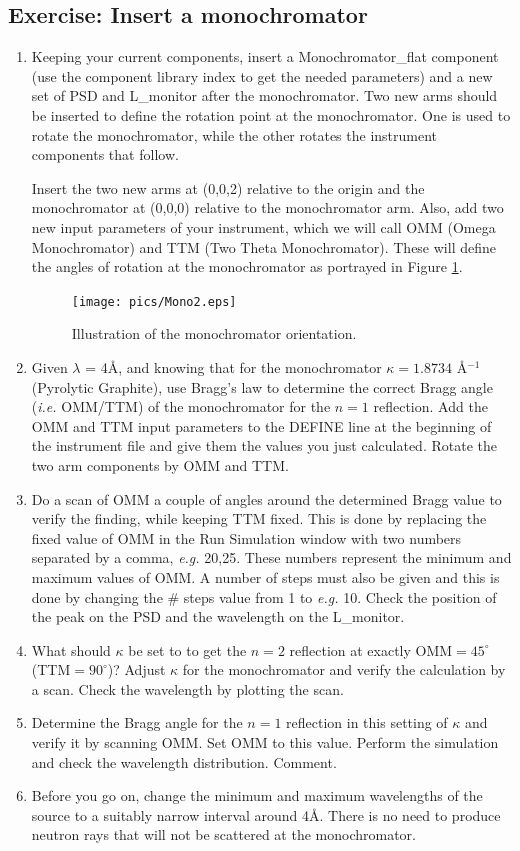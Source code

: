 \subsection{Exercise: Insert a monochromator}
\begin{enumerate}
\item{Keeping your current components, insert a Monochromator\_flat component (use the component library index to get the needed parameters) and a new set of PSD and L\_monitor after the monochromator. Two new arms should be inserted to define the rotation point at the monochromator. One is used to rotate the monochromator, while the other rotates the instrument components that follow. 

Insert the two new arms at (0,0,2) relative to the origin and the monochromator at (0,0,0) relative to the monochromator arm. Also, add two new input parameters of your instrument, which we will call OMM (Omega Monochromator) and TTM (Two Theta Monochromator). These will define the angles of rotation at the monochromator as portrayed in Figure \ref{mono.eps}. 
\begin{figure}[htb!]
\begin{center}
\texttt{[image: pics/Mono2.eps]}
\end{center}
\caption{Illustration of the monochromator orientation.}
\label{mono.eps}
\end{figure}}
\item{Given $\lambda$ = 4\AA, and knowing that for the monochromator $\kappa=1.8734$ \AA$^{-1}$ (Pyrolytic Graphite), use Bragg's law to determine the correct Bragg angle (\emph{i.e.} OMM/TTM) of the monochromator for the $n=1$ reflection. Add the OMM and TTM input parameters to the DEFINE line at the beginning of the instrument file and give them the values you just calculated. Rotate the two arm components by OMM and TTM.}
\item{Do a scan of OMM a couple of angles around the determined Bragg value to verify the finding, while keeping TTM fixed. This is done by replacing the fixed value of OMM in the Run Simulation window with two numbers separated by a comma, \emph{e.g.} 20,25. These numbers represent the minimum and maximum values of OMM. A number of steps must also be given and this is done by changing the \# steps value from 1 to \emph{e.g.} 10. Check the position of the peak on the PSD and the wavelength on the L\_monitor. }
\item{What should $\kappa$ be set to to get the $n=2$ reflection at exactly OMM$=45^\circ$ (TTM$=90^\circ$)? Adjust $\kappa$ for the monochromator and verify the calculation by a scan. Check the wavelength by plotting the scan.}
\item{Determine the Bragg angle for the $n=1$ reflection in this setting of $\kappa$ and verify it by scanning OMM. Set OMM to this value. Perform the simulation and check the wavelength distribution. Comment.}
\item{Before you go on, change the minimum and maximum wavelengths of the source to a suitably narrow interval around 4\AA. There is no need to produce neutron rays that will not be scattered at the monochromator.}
\end{enumerate}
